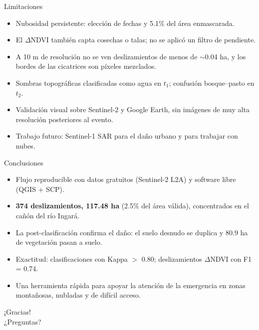 \documentclass[aspectratio=169,11pt]{beamer}
\begin{document}
\begin{frame}{Limitaciones}
\begin{itemize}
  \item Nubosidad persistente: elección de fechas y 5.1\% del área enmascarada.
  \item El $\Delta$NDVI también capta cosechas o talas; no se aplicó un filtro de pendiente.
  \item A 10 m de resolución no se ven deslizamientos de menos de $\sim$0.04 ha, y los bordes de las cicatrices son píxeles mezclados.
  \item Sombras topográficas clasificadas como agua en $t_1$; confusión bosque--pasto en $t_2$.
  \item Validación visual sobre Sentinel-2 y Google Earth, sin imágenes de muy alta resolución posteriores al evento.
  \item Trabajo futuro: Sentinel-1 SAR para el daño urbano y para trabajar con nubes.
\end{itemize}
\end{frame}

\begin{frame}{Conclusiones}
\begin{itemize}
  \item Flujo reproducible con datos gratuitos (Sentinel-2 L2A) y software libre (QGIS + SCP).
  \item \textbf{374 deslizamientos, 117.48 ha} (2.5\% del área válida), concentrados en el cañón del río Ingará.
  \item La post-clasificación confirma el daño: el suelo desnudo se duplica y 80.9 ha de vegetación pasan a suelo.
  \item Exactitud: clasificaciones con Kappa $>$ 0.80; deslizamientos $\Delta$NDVI con F1 = 0.74.
  \item Una herramienta rápida para apoyar la atención de la emergencia en zonas montañosas, nubladas y de difícil acceso.
\end{itemize}
\end{frame}

\begin{frame}[standout]
¡Gracias!\\[3mm]
\normalsize ¿Preguntas?
\end{frame}
\end{document}

